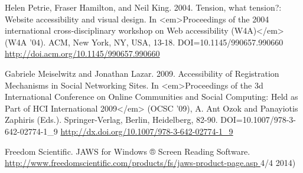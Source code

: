 \documentclass[conference]{IEEEtran}
\begin{document}
\begin{thebibliography}{1}
Helen Petrie, Fraser Hamilton, and Neil King. 2004. Tension, what tension?:
Website accessibility and visual design.  In <em>Proceedings of the 2004
international cross-disciplinary workshop on Web accessibility (W4A)</em> (W4A
'04). ACM, New York, NY, USA,  13-18. DOI=10.1145/990657.990660
\href{http://doi.acm.org/10.1145/990657.990660}{http://doi.acm.org/10.1145/990657.990660}

Gabriele Meiselwitz and Jonathan Lazar. 2009. Accessibility of Registration
Mechanisms in Social Networking Sites.  In <em>Proceedings of the 3d
International Conference on Online Communities and Social Computing: Held as
Part of HCI International 2009</em> (OCSC '09), A. Ant Ozok and Panayiotis
Zaphiris (Eds.). Springer-Verlag, Berlin, Heidelberg,  82-90.
DOI=10.1007/978-3-642-02774-1\_9 \href{http://dx.doi.org/10.1007/978-3-642-02774-1\_9}{http://dx.doi.org/10.1007/978-3-642-02774-1\_9}

Freedom Scientific. JAWS for Windows ® Screen Reading Software.
\href{http://www.freedomscientific.com/products/fs/jaws-product-page.asp}{http://www.freedomscientific.com/products/fs/jaws-product-page.asp }
4/4 2014)

\end{thebibliography}
\end{document}
